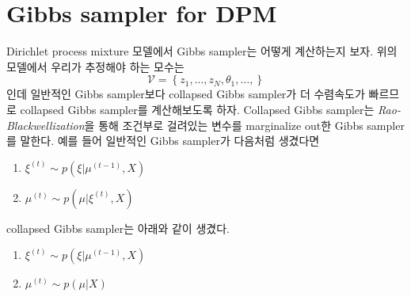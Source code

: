 \documentclass[a4paper, 10pt]{book}
\begin{document}
  \section{Gibbs sampler for DPM}
  Dirichlet process mixture 모델에서 Gibbs sampler는 어떻게 계산하는지 보자. 위의 모델에서 우리가 추정해야 하는 모수는 
  \begin{equation}
    \mathcal{V}=\left\{z_{1},\ldots, z_{N}, \theta_{1},\ldots, \right\}
  \end{equation}
  인데 일반적인 Gibbs sampler보다 collapsed Gibbs sampler가 더 수렴속도가 빠르므로 collapsed Gibbs sampler를 계산해보도록 하자. Collapsed Gibbs sampler는 \emph{Rao-Blackwellization}을 통해 조건부로 걸려있는 변수를 marginalize out한 Gibbs sampler를 말한다. 예를 들어 일반적인 Gibbs sampler가 다음처럼 생겼다면
  \begin{enumerate}
    \item $\xi^{\left(t\right)} \sim p\left(\xi|\mu^{\left(t-1\right)}, X\right)$
    \item $\mu^{\left(t\right)} \sim p\left(\mu|\xi^{\left(t\right)},X\right)$
  \end{enumerate}
  
  collapsed Gibbs sampler는 아래와 같이 생겼다.
  \begin{enumerate}
    \item $\xi^{\left(t\right)}\sim p\left(\xi|\mu^{\left(t-1\right)},X\right)$
    \item $\mu^{\left(t\right)}\sim p\left(\mu|X\right)$
  \end{enumerate}
  
\end{document}
